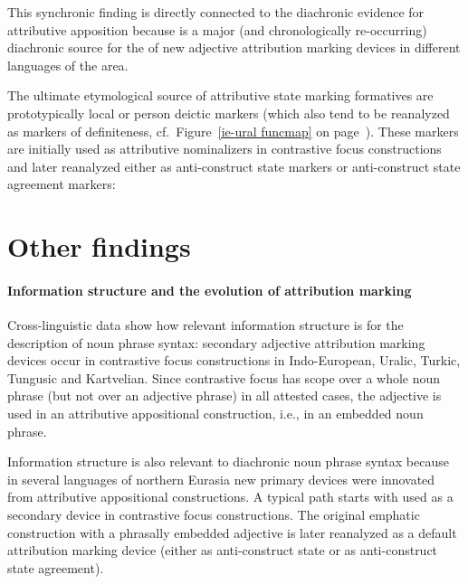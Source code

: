 This synchronic finding is directly connected to the diachronic evidence for attributive apposition because  is a major (and chronologically re-occurring) diachronic source for the  of new adjective attribution marking devices in different languages of the area.

The ultimate etymological source of attributive state marking formatives are prototypically local or person deictic markers (which also tend to be reanalyzed as markers of definiteness, cf.~Figure~\ref{ie-ural funcmap} on page~\pageref{ie-ural funcmap}). These markers are initially used as attributive nominalizers in contrastive focus constructions and later reanalyzed either as anti\hyp{}construct state markers or anti\hyp{}construct state agreement markers:
\begin{exe}
\ex
\begin{xlist}
\end{xlist}
\end{exe}

\section{Other findings}
\paragraph*{Information structure and the evolution of attribution marking} Cross\hyp{}linguistic data show how relevant information structure is for the description of noun phrase syntax: secondary adjective attribution marking devices occur in contrastive focus constructions in Indo-European, Uralic, Turkic, Tungusic and Kartvelian. Since contrastive focus has scope over a whole noun phrase (but not over an adjective phrase) in all attested cases, the adjective is used in an attributive appositional construction, i.e., in an embedded noun phrase.

Information structure is also relevant to diachronic noun phrase syntax because in several languages of northern Eurasia new primary devices were innovated from attributive appositional constructions. A typical  path starts with  used as a secondary device in contrastive focus constructions. The original emphatic construction with a phrasally embedded adjective is later reanalyzed as a default attribution marking device (either as anti\hyp{}construct state or as anti\hyp{}construct state agreement).

